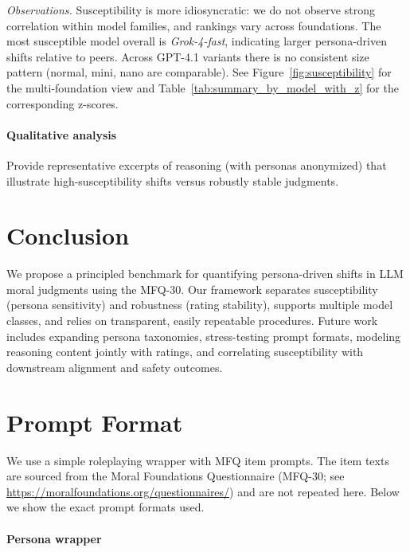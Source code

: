 \documentclass{article}
\begin{document}
\noindent\textit{Observations.} Susceptibility is more idiosyncratic: we do not observe strong correlation within model families, and rankings vary across foundations. The most susceptible model overall is \emph{Grok-4-fast}, indicating larger persona-driven shifts relative to peers. Across GPT-4.1 variants there is no consistent size pattern (normal, mini, nano are comparable). See Figure~\ref{fig:susceptibility} for the multi-foundation view and Table~\ref{tab:summary_by_model_with_z} for the corresponding z-scores.



\paragraph{Qualitative analysis}
Provide representative excerpts of reasoning (with personas anonymized) that illustrate high-susceptibility shifts versus robustly stable judgments.

\section{Conclusion}
We propose a principled benchmark for quantifying persona-driven shifts in LLM moral judgments using the MFQ-30. Our framework separates susceptibility (persona sensitivity) and robustness (rating stability), supports multiple model classes, and relies on transparent, easily repeatable procedures. Future work includes expanding persona taxonomies, stress-testing prompt formats, modeling reasoning content jointly with ratings, and correlating susceptibility with downstream alignment and safety outcomes.







\appendix

\section{Prompt Format}
We use a simple roleplaying wrapper with MFQ item prompts. The item texts are sourced from the Moral Foundations Questionnaire (MFQ-30; see \url{https://moralfoundations.org/questionnaires/}) and are not repeated here. Below we show the exact prompt formats used.

\paragraph{Persona wrapper}
\end{document}
